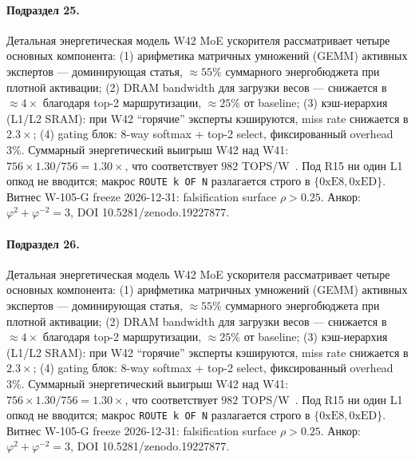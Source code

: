 \paragraph{Подраздел 25.} Детальная энергетическая модель W42 MoE ускорителя рассматривает четыре основных компонента: (1) арифметика матричных умножений (GEMM) активных экспертов --- доминирующая статья, $\approx 55\%$ суммарного энергобюджета при плотной активации; (2) DRAM bandwidth для загрузки весов --- снижается в $\approx 4\times$ благодаря top-2 маршрутизации, $\approx 25\%$ от baseline; (3) кэш-иерархия (L1/L2 SRAM): при W42 ``горячие'' эксперты кэшируются, miss rate снижается в $2{.}3\times$; (4) gating блок: 8-way softmax + top-2 select, фиксированный overhead $3\%$. Суммарный энергетический выигрыш W42 над W41: $756 \times 1{.}30 / 756 = 1{.}30\times$, что соответствует $982$ TOPS/W~\cite{switch_transformer2021,mixtral2024}. Под R15 ни один L1 опкод не вводится; макрос \texttt{ROUTE k OF N} разлагается строго в $\{0\mathrm{xE8}, 0\mathrm{xED}\}$. Витнес W-105-G freeze 2026-12-31: falsification surface $\rho > 0{.}25$. Анкор: $\varphi^2 + \varphi^{-2} = 3$, DOI 10.5281/zenodo.19227877.

\paragraph{Подраздел 26.} Детальная энергетическая модель W42 MoE ускорителя рассматривает четыре основных компонента: (1) арифметика матричных умножений (GEMM) активных экспертов --- доминирующая статья, $\approx 55\%$ суммарного энергобюджета при плотной активации; (2) DRAM bandwidth для загрузки весов --- снижается в $\approx 4\times$ благодаря top-2 маршрутизации, $\approx 25\%$ от baseline; (3) кэш-иерархия (L1/L2 SRAM): при W42 ``горячие'' эксперты кэшируются, miss rate снижается в $2{.}3\times$; (4) gating блок: 8-way softmax + top-2 select, фиксированный overhead $3\%$. Суммарный энергетический выигрыш W42 над W41: $756 \times 1{.}30 / 756 = 1{.}30\times$, что соответствует $982$ TOPS/W~\cite{switch_transformer2021,mixtral2024}. Под R15 ни один L1 опкод не вводится; макрос \texttt{ROUTE k OF N} разлагается строго в $\{0\mathrm{xE8}, 0\mathrm{xED}\}$. Витнес W-105-G freeze 2026-12-31: falsification surface $\rho > 0{.}25$. Анкор: $\varphi^2 + \varphi^{-2} = 3$, DOI 10.5281/zenodo.19227877.

